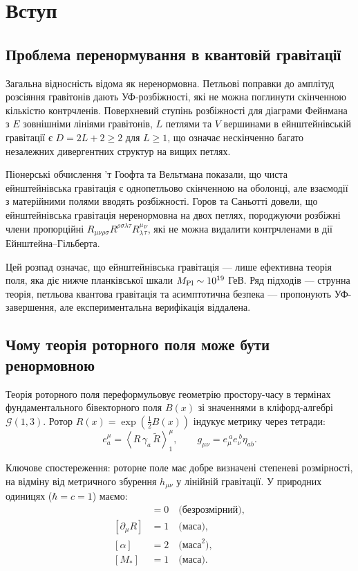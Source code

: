 \documentclass[11pt,a4paper]{article}
\numberwithin{equation}{section}
\theoremstyle{plain}
\theoremstyle{definition}
\theoremstyle{remark}
\newcommand{\Cl}{\mathcal{G}}               %
\newcommand{\rev}[1]{\widetilde{#1}}        %
\newcommand{\grade}[2]{\left\langle #1 \right\rangle_{#2}}
\begin{document}
\section{Вступ}\label{sec:intro}

\subsection{Проблема перенормування в квантовій гравітації}

Загальна відносність відома як неренормовна. Петльові поправки до амплітуд розсіяння гравітонів дають УФ-розбіжності, які не можна поглинути скінченною кількістю контрчленів. Поверхневий ступінь розбіжності для діаграми Фейнмана з $E$ зовнішніми лініями гравітонів, $L$ петлями та $V$ вершинами в ейнштейнівській гравітації є $D=2L+2\ge 2$ для $L\ge 1$, що означає нескінченно багато незалежних дивергентних структур на вищих петлях.

Піонерські обчислення ’т Гоофта та Вельтмана показали, що чиста ейнштейнівська гравітація є однопетльово скінченною на оболонці, але взаємодії з матерійними полями вводять розбіжності. Горов та Саньотті довели, що ейнштейнівська гравітація неренормовна на двох петлях, породжуючи розбіжні члени пропорційні $R_{\mu\nu\rho\sigma}R^{\rho\sigma\lambda\tau}R_\lambda^\mu{}_\tau^\nu$, які не можна видалити контрчленами в дії Ейнштейна–Гільберта.

Цей розпад означає, що ейнштейнівська гравітація — лише ефективна теорія поля, яка діє нижче планківської шкали $M_{\rm Pl}\sim 10^{19}$ ГеВ. Ряд підходів — струнна теорія, петльова квантова гравітація та асимптотична безпека — пропонують УФ-завершення, але експериментальна верифікація віддалена.

\subsection{Чому теорія роторного поля може бути ренормовною}

Теорія роторного поля переформульовує геометрію простору-часу в термінах фундаментального бівекторного поля $B(x)$ зі значеннями в кліфорд-алгебрі $\Cl(1,3)$. Ротор $R(x)=\exp(\tfrac12 B(x))$ індукує метрику через тетради:
\begin{equation}
e_a^\mu = \grade{R\,\gamma_a\,\rev{R}}{1}^\mu, \qquad g_{\mu\nu}=e_\mu^{\ a}e_\nu^{\ b}\eta_{ab}.
\label{eq:metric-rotor}
\end{equation}

Ключове спостереження: роторне поле має добре визначені степеневі розмірності, на відміну від метричного збурення $h_{\mu\nu}$ у лінійній гравітації. У природних одиницях ($\hbar=c=1$) маємо:
\begin{align}
[R] &= 0 \quad\text{(безрозмірний)}, \label{eq:dim-R}\\
[\partial_\mu R] &= 1 \quad\text{(маса)}, \label{eq:dim-dR}\\
[\alpha] &= 2 \quad\text{(маса}^2\text{)}, \label{eq:dim-alpha}\\
[M_*] &= 1 \quad\text{(маса)}.\label{eq:dim-Mstar}
\end{align}
\end{document}
